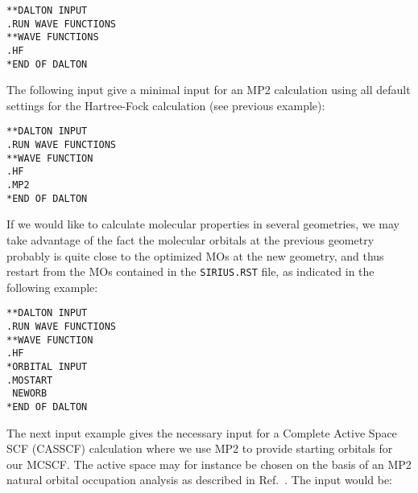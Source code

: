 \begin{verbatim}
**DALTON INPUT
.RUN WAVE FUNCTIONS
**WAVE FUNCTIONS
.HF
*END OF DALTON
\end{verbatim}
\label{sirius_ex1a}

The following input give a minimal input for an
MP2
calculation using all default settings for the Hartree-Fock
calculation (see previous example):

\begin{verbatim}
**DALTON INPUT
.RUN WAVE FUNCTIONS
**WAVE FUNCTION
.HF
.MP2
*END OF DALTON
\end{verbatim}
\label{sirius_ex1b}

If we would like to calculate molecular properties in several
geometries, we may take advantage of the fact the molecular
orbitals at the previous geometry probably is quite close to the
optimized MOs at the new geometry, and thus restart
from the MOs contained in the \verb|SIRIUS.RST|
file, as indicated in the following example:

\begin{verbatim}
**DALTON INPUT
.RUN WAVE FUNCTIONS
**WAVE FUNCTION
.HF
*ORBITAL INPUT
.MOSTART
 NEWORB
*END OF DALTON
\end{verbatim}
\label{sirius_ex2}

\begin{center}
\end{center}

The next input example gives the necessary input for a Complete
Active Space SCF (CASSCF) calculation where we use MP2 to provide
starting orbitals for our MCSCF. The
active space may for instance be
chosen on the basis of an MP2 natural orbital occupation
analysis as
described in Ref.~\cite{hjajpjhajojcp88}. The input would be:

